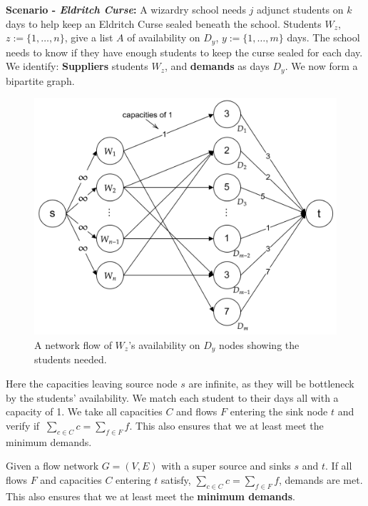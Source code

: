 \newpage

\noindent
\textbf{Scenario - \textit{Eldritch Curse}:} A wizardry school needs $j$ adjunct students on 
$k$ days to help keep an Eldritch Curse sealed beneath the school. Students $W_z$, $z:=\{1,\dots,n\}$, give a list $A$ of availability on
$D_y$, $y:=\{1,\dots,m\}$ days. The school needs to know if they have enough students to keep the curse sealed for each day.\\

\noindent
We identify: \textbf{Suppliers} students $W_z$, and \textbf{demands} as days $D_y$. We now form a bipartite graph.

\begin{figure}[h]
    \centering
    \includegraphics[width=.7\textwidth]{Sections/net/wizards.png}
    \caption{A network flow of $W_z$'s availability on $D_y$ nodes showing the students needed.}
\end{figure}

\noindent
Here the capacities leaving source node $s$ are infinite, as they will be bottleneck by the students' availability. 
We match each student to their days all with a capacity of 1. We take all capacities $C$ and flows $F$ entering the sink node $t$
and verify if $\ \displaystyle{\sum_{c\in C} c = \sum_{f\in F} f}$. This also ensures that 
we at least meet the minimum demands.
\begin{theo}

    Given a flow network $G=(V,E)$ with a super source and sinks $s$ and $t$. If all flows $F$ and capacities $C$ entering $t$ satisfy,
    $\displaystyle{\sum_{c\in C} c = \sum_{f\in F} f}$, demands are met. This also ensures that we at least meet the \textbf{minimum demands}.
\end{theo}


\newpage 

